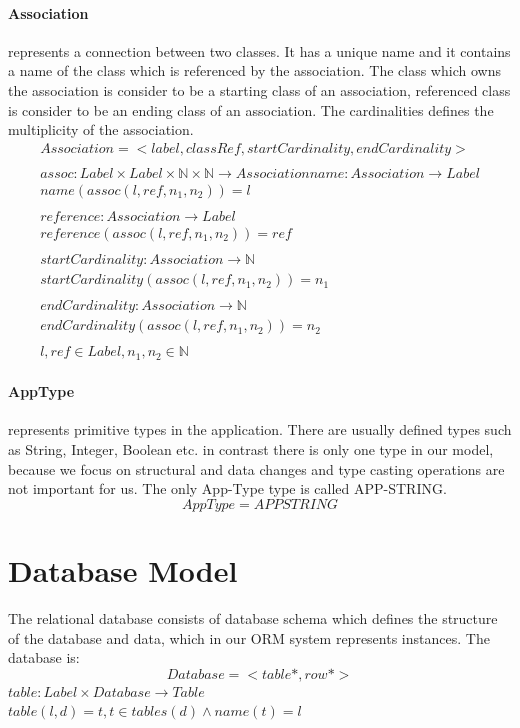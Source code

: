 \documentclass[11pt]{article}
\begin{document}
\paragraph {Association} represents a connection between two classes. It has a unique name and it contains a name of the class which is referenced by the association. The class which owns the association is consider to be a starting class of an association, referenced class is consider to be an ending class of an association. The cardinalities defines the multiplicity of the association.
\begin{gather*}
Association = <label, classRef, startCardinality, endCardinality> \\ \\
assoc : Label \times Label \times \mathbb{N} \times \mathbb{N} \rightarrow Association
name : Association \rightarrow Label \\
name(assoc(l, ref, n_1, n_2)) = l\\ \\
reference : Association \rightarrow Label \\
reference(assoc(l, ref, n_1, n_2)) = ref\\ \\
startCardinality : Association \rightarrow \mathbb{N} \\
startCardinality(assoc(l, ref, n_1, n_2)) = n_1\\ \\
endCardinality : Association \rightarrow \mathbb{N} \\
endCardinality(assoc(l, ref, n_1, n_2)) = n_2 \\ \\
l, ref \in Label,  n_1, n_2 \in \mathbb{N}
\end{gather*}



\paragraph{AppType} represents primitive types in the application. There are usually defined types such as String, Integer, Boolean etc. in contrast there is only one type in our model, because we focus on structural and data changes and type casting operations are not important for us. The only App-Type type is called APP-STRING.
$$
AppType = APPSTRING
$$


\section{Database Model}
\label{sec:dbModel}
The relational database consists of database schema which defines the structure of the database and data, which in our ORM system represents instances. The database is:
$$
Database = <table*, row*>
$$
$table : Label \times Database \rightarrow Table $ \\
$table(l, d) = t, t \in tables(d) \wedge name(t) = l$ \\
\end{document}
